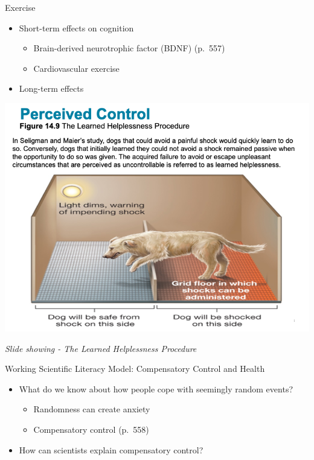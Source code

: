 \documentclass[
]{book}
\providecommand{\tightlist}{%
  \setlength{\itemsep}{0pt}\setlength{\parskip}{0pt}}
\begin{document}
\begin{reflect}
Exercise

\begin{itemize}
\tightlist
\item
  Short-term effects on cognition

  \begin{itemize}
  \tightlist
  \item
    Brain-derived neurotrophic factor (BDNF) (p.~557)\\
  \item
    Cardiovascular exercise\\
  \end{itemize}
\item
  Long-term effects
\end{itemize}

\includegraphics{assets/unit_8/slide_45.png}

\emph{Slide showing - The Learned Helplessness Procedure}

Working Scientific Literacy Model: Compensatory Control and Health

\begin{itemize}
\tightlist
\item
  What do we know about how people cope with seemingly random events?

  \begin{itemize}
  \tightlist
  \item
    Randomness can create anxiety\\
  \item
    Compensatory control (p.~558)\\
  \end{itemize}
\item
  How can scientists explain compensatory control?
\end{itemize}


\end{reflect}
\end{document}
